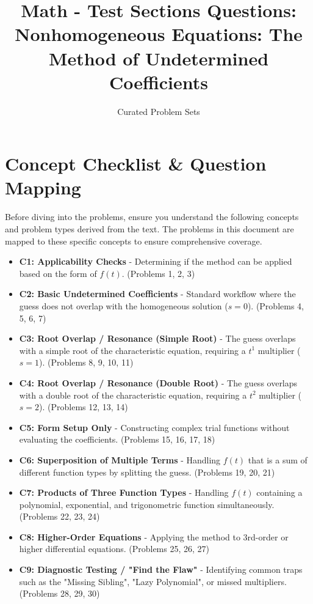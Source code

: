 \documentclass[11pt]{article}
\title{Math - Test Sections Questions: \\ Nonhomogeneous Equations: The Method of Undetermined Coefficients}
\author{Curated Problem Sets}
\date{}
\begin{document}
\maketitle
\tableofcontents
\newpage

\section{Concept Checklist \& Question Mapping}
Before diving into the problems, ensure you understand the following concepts and problem types derived from the text. The problems in this document are mapped to these specific concepts to ensure comprehensive coverage.

\begin{itemize}
    \item \textbf{C1: Applicability Checks} - Determining if the method can be applied based on the form of $f(t)$. (Problems 1, 2, 3)
    \item \textbf{C2: Basic Undetermined Coefficients} - Standard workflow where the guess does not overlap with the homogeneous solution ($s=0$). (Problems 4, 5, 6, 7)
    \item \textbf{C3: Root Overlap / Resonance (Simple Root)} - The guess overlaps with a simple root of the characteristic equation, requiring a $t^1$ multiplier ($s=1$). (Problems 8, 9, 10, 11)
    \item \textbf{C4: Root Overlap / Resonance (Double Root)} - The guess overlaps with a double root of the characteristic equation, requiring a $t^2$ multiplier ($s=2$). (Problems 12, 13, 14)
    \item \textbf{C5: Form Setup Only} - Constructing complex trial functions without evaluating the coefficients. (Problems 15, 16, 17, 18)
    \item \textbf{C6: Superposition of Multiple Terms} - Handling $f(t)$ that is a sum of different function types by splitting the guess. (Problems 19, 20, 21)
    \item \textbf{C7: Products of Three Function Types} - Handling $f(t)$ containing a polynomial, exponential, and trigonometric function simultaneously. (Problems 22, 23, 24)
    \item \textbf{C8: Higher-Order Equations} - Applying the method to 3rd-order or higher differential equations. (Problems 25, 26, 27)
    \item \textbf{C9: Diagnostic Testing / "Find the Flaw"} - Identifying common traps such as the "Missing Sibling", "Lazy Polynomial", or missed multipliers. (Problems 28, 29, 30)
\end{itemize}
\end{document}
